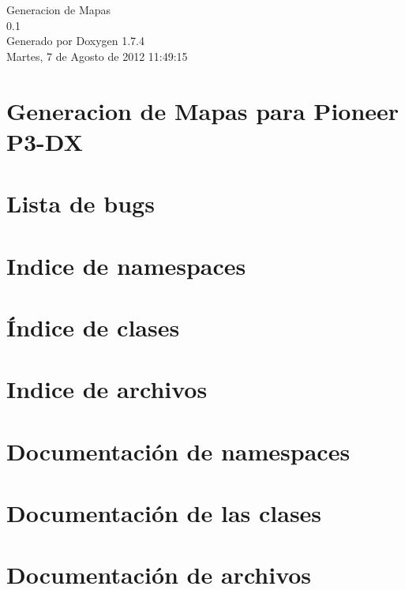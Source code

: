 \documentclass[a4paper]{book}
\begin{document}
\hypersetup{pageanchor=false}
\begin{titlepage}
\vspace*{7cm}
\begin{center}
{\Large Generacion de Mapas \\[1ex]\large 0.1 }\\
\vspace*{1cm}
{\large Generado por Doxygen 1.7.4}\\
\vspace*{0.5cm}
{\small Martes, 7 de Agosto de 2012 11:49:15}\\
\end{center}
\end{titlepage}
\clearemptydoublepage
{}
\tableofcontents
\clearemptydoublepage
{}
\hypersetup{pageanchor=true}
\chapter{Generacion de Mapas para Pioneer P3-\/DX}
\label{index}\hypertarget{index}{}
\chapter{Lista de bugs}
\label{bug}
\hypertarget{bug}{}

\chapter{Indice de namespaces}

\chapter{Índice de clases}

\chapter{Indice de archivos}

\chapter{Documentación de namespaces}





\chapter{Documentación de las clases}




\chapter{Documentación de archivos}






\printindex
\end{document}
